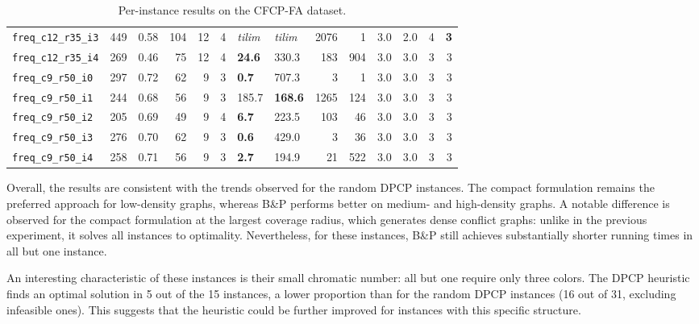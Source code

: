 \documentclass[preprint, 11pt, authoryear]{elsarticle}
\begin{document}
\begin{table}[]
\begin{tabular}{lrrrrrllrrrrrr}
\texttt{freq\_c12\_r35\_i3} & 449 & 0.58 & 104 & 12 & 4 & \textit{tilim} & \textit{tilim} & 2076 & 1 & 3.0 & 2.0 & 4 & \textbf{3} \\
\texttt{freq\_c12\_r35\_i4} & 269 & 0.46 & 75 & 12 & 4 & \textbf{24.6} & 330.3 & 183 & 904 & 3.0 & 3.0 & 3 & 3 \\
\midrule
\texttt{freq\_c9\_r50\_i0} & 297 & 0.72 & 62 & 9 & 3 & \textbf{0.7} & 707.3 & 3 & 1 & 3.0 & 3.0 & 3 & 3 \\
\texttt{freq\_c9\_r50\_i1} & 244 & 0.68 & 56 & 9 & 3 & 185.7 & \textbf{168.6} & 1265 & 124 & 3.0 & 3.0 & 3 & 3 \\
\texttt{freq\_c9\_r50\_i2} & 205 & 0.69 & 49 & 9 & 4 & \textbf{6.7} & 223.5 & 103 & 46 & 3.0 & 3.0 & 3 & 3 \\
\texttt{freq\_c9\_r50\_i3} & 276 & 0.70 & 62 & 9 & 3 & \textbf{0.6} & 429.0 & 3 & 36 & 3.0 & 3.0 & 3 & 3 \\
\texttt{freq\_c9\_r50\_i4} & 258 & 0.71 & 56 & 9 & 3 & \textbf{2.7} & 194.9 & 21 & 522 & 3.0 & 3.0 & 3 & 3 \\
\bottomrule
\end{tabular}
\caption{Per-instance results on the CFCP-FA dataset.}
\label{table.results.freq}
\end{table}

Overall, the results are consistent with the trends observed for the random DPCP instances. 
The compact formulation remains the preferred approach for low-density graphs, whereas B\&P performs better on medium- and high-density graphs. 
A notable difference is observed for the compact formulation at the largest coverage radius, which generates dense conflict graphs: unlike in the previous experiment, it solves all instances to optimality. 
Nevertheless, for these instances, B\&P still achieves substantially shorter running times in all but one instance.

An interesting characteristic of these instances is their small chromatic number: all but one require only three colors. 
The DPCP heuristic finds an optimal solution in 5 out of the 15 instances, a lower proportion than for the random DPCP instances (16 out of 31, excluding infeasible ones).
This suggests that the heuristic could be further improved for instances with this specific structure.
\end{document}
